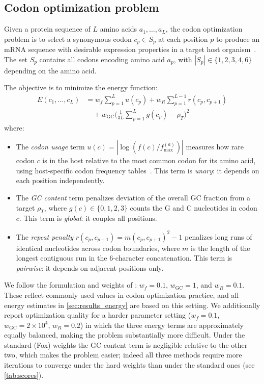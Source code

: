 \documentclass[11pt,twocolumn]{article}
\begin{document}
\subsection{Codon optimization problem}
\label{sec:methods_codon_opt}

Given a protein sequence of $L$ amino acids $a_1, \ldots, a_L$, the codon optimization problem is to select a synonymous codon $c_p \in S_p$ at each position $p$ to produce an mRNA sequence with desirable expression properties in a target host organism~\cite{gustafsson2004codon, quax2015codon, brule2017synonymous}.
The set $S_p$ contains all codons encoding amino acid $a_p$, with $|S_p| \in \{1, 2, 3, 4, 6\}$ depending on the amino acid.

The objective is to minimize the energy function:
\begin{align}
E(c_1, \ldots, c_L) &= w_f \sum_{p=1}^{L} u(c_p) + w_R \sum_{p=1}^{L-1} r(c_p, c_{p+1}) \nonumber \\
&\quad + w_\text{GC} \bigg( \frac{1}{3L} \sum_{p=1}^{L} g(c_p) - \rho_T \bigg)^{\!2}
\label{eq:energy}
\end{align}
where:
\begin{itemize}
\item The \emph{codon usage} term $u(c) = |\log(f(c) / f_\text{max}^{(a)})|$ measures how rare codon $c$ is in the host relative to the most common codon for its amino acid, using host-specific codon frequency tables~\cite{nakamura2000codon}. This term is \emph{unary}: it depends on each position independently.
\item The \emph{GC content} term penalizes deviation of the overall GC fraction from a target $\rho_T$, where $g(c) \in \{0, 1, 2, 3\}$ counts the G and C nucleotides in codon $c$. This term is \emph{global}: it couples all positions.
\item The \emph{repeat penalty} $r(c_p, c_{p+1}) = m(c_p, c_{p+1})^2 - 1$ penalizes long runs of identical nucleotides across codon boundaries, where $m$ is the length of the longest contiguous run in the 6-character concatenation. This term is \emph{pairwise}: it depends on adjacent positions only.
\end{itemize}
We follow the formulation and weights of \cite{fox2021mrna}: $w_f = 0.1$, $w_\text{GC} = 1$, and $w_R = 0.1$.
These reflect commonly used values in codon optimization practice, and all energy estimates in \cref{sec:results_energy} are based on this setting.
We additionally report optimization quality for a harder parameter setting ($w_f = 0.1$, $w_\text{GC} = 2 \times 10^4$, $w_R = 0.2$) in which the three energy terms are approximately equally balanced, making the problem substantially more difficult.
Under the standard (Fox) weights the GC content term is negligible relative to the other two, which makes the problem easier; indeed all three methods require more iterations to converge under the hard weights than under the standard ones (see \cref{tab:scores}).
\end{document}
